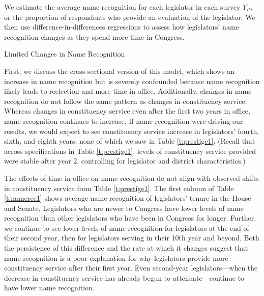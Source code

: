 \documentclass[12pt]{article}
\begin{document}
We estimate the average name recognition for each legislator in each survey $Y_{it}$, or the proportion of respondents who provide an evaluation of the legislator. We then use difference-in-differences regressions to assess how legislators' name recognition changes as they spend more time in Congress.  

\begin{table}[hbt!]
\caption{Limited Changes in Name Recognition} \label{t:namerec1}

\begin{minipage}{\textwidth}
\begin{center}

\end{center}
\end{minipage}
\end{table}

First, we discuss the cross-sectional version of this model, which shows an increase in name recognition but is severely confounded because name recognition likely leads to reelection and more time in office. Additionally, changes in name recognition do not follow the same pattern as changes in constituency service. Whereas changes in constituency service even after the first two years in office, name recognition continues to increase. If name recognition were driving our results, we would expect to see constituency service increase in legislators' fourth, sixth, and eighth years; none of which we saw in Table \ref{t:prestige1}. (Recall that across specifications in Table \ref{t:prestige1}, levels of constituency service provided were stable after year 2, controlling for legislator and district characteristics.)

The effects of time in office on name recognition do not align with observed shifts in constituency service from Table \ref{t:prestige1}.
The first column of Table \ref{t:namerec1} shows average name recognition of legislators' tenure in the House and Senate. Legislators who are newer to Congress have lower levels of name recognition than other legislators who have been in Congress for longer. Further, we continue to see lower levels of name recognition for legislators at the end of their second year, then for legislators serving in their 10th year and beyond. Both the persistence of this difference and the rate at which it changes suggest that name recognition is a poor explanation for why legislators provide more constituency service after their first year. Even second-year legislators---when the decrease in constituency service has already begun to attenuate---continue to have lower name recognition.  %
\end{document}
